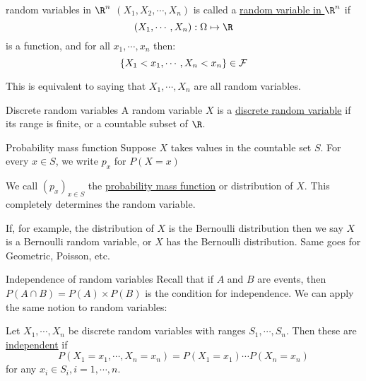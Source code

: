 \documentclass[../Main.tex]{subfiles}
\begin{document}
\begin{definition}{random variables in $\R^n$}
    $(X_1, X_2, \cdots, X_n)$ is called a \underline{random variable in $\R^n$} if
    \begin{equation*}
        (X_1, \cdots, X_n) : \Omega \mapsto \R
    \end{equation*}
    is a function, and for all $x_1, \cdots, x_n$ then:
    \begin{equation*}
        \{X_1 < x_1, \cdots, X_n < x_n\} \in \mathcal{F}
    \end{equation*}
\end{definition}
This is equivalent to saying that $X_1, \cdots, X_n$ are all random variables.
\begin{definition}{Discrete random variables}
    A random variable $X$ is a \underline{discrete random variable} if its range is finite, or a countable subset of $\R$.
\end{definition}
\begin{definition}{Probability mass function}
    Suppose $X$ takes values in the countable set $S$. For every $x \in S$, we write $p_x$ for $P(X = x)$\par
    We call $(p_x)_{x \in S}$ the \underline{probability mass function} or distribution of $X$. This completely determines the random variable.
\end{definition}
If, for example, the distribution of $X$ is the Bernoulli distribution then we say $X$ is a Bernoulli random variable, or $X$ has the Bernoulli distribution. Same goes for Geometric, Poisson, etc.
\begin{definition}{Independence of random variables}
    Recall that if $A$ and $B$ are events, then $P(A \cap B) = P(A) \times P(B)$ is the condition for independence. We can apply the same notion to random variables:\par
    Let $X_1, \cdots, X_n$ be discrete random variables with ranges $S_1, \cdots, S_n$. Then these are \underline{independent} if 
    \begin{equation*}
        P(X_1 = x_1, \cdots, X_n = x_n) = P(X_1 = x_1) \cdots P(X_n = x_n)
    \end{equation*}
    for any $x_i \in S_i, i = 1, \cdots, n$.
\end{definition}
\end{document}
